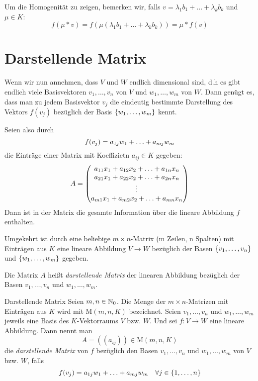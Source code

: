 Um die Homogenität zu zeigen, bemerken wir, falls $v=\lambda_1b_1+\ldots+\lambda_kb_k$ und $\mu\in K$:
\begin{equation*}
  f(\mu*v)=f(\mu(\lambda_1b_1+\ldots+\lambda_kb_k))=\mu*f(v)
\end{equation*}

\section{Darstellende Matrix}
Wenn wir nun annehmen, dass $V$ und $W$ endlich dimensional sind, d.h es gibt endlich viele Basisvektoren $v_1,\ldots,v_n$ von $V$ und $w_1,\ldots,w_m$ von $W$. Dann genügt es, dass man zu jedem Basisvektor $v_j$ die eindeutig bestimmte Darstellung des Vektors $f(v_j)$ bezüglich der Basis $\left\{ w_1,\ldots,w_m \right\}$ kennt.

Seien also durch
\begin{equation*}
  f(v_j) = a_{1j}w_1+\ldots+a_{mj}w_m
\end{equation*}
die Einträge einer Matrix mit Koeffizietn $a_{ij} \in K$ gegeben:
\begin{equation*}
  A=\matrix{
  \ma{11}x_1+\ma{12}x_2+\ldots+\ma{1n}x_n\\
  \ma{21}x_1+\ma{22}x_2+\ldots+\ma{2n}x_n\\
  \vdots\\
  \ma{m1}x_1+\ma{m2}x_2+\ldots+\ma{mn}x_n\\
  }
\end{equation*}
Dann ist in der Matrix die gesamte Information über die lineare Abbildung $f$ enthalten.

Umgekehrt ist durch eine beliebige $m\times n$-Matrix (m Zeilen, n Spalten) mit Einträgen aus $K$ eine lineare Abbildung $V\rightarrow W$ bezüglich der Basen $\left\{ v_1,\ldots,v_n \right\}$ und $\left\{ w_1,\ldots,w_m \right\}$ gegeben.

Die Matrix $A$ heißt \emph{darstellende Matrix} der linearen Abbildung bezüglich der Basen $v_1,\ldots,v_n$ und $w_1,\ldots,w_m$.

\begin{definition}{Darstellende Matrix}
	Seien $m,n\in\mathbb{N}_0$. Die Menge der $m\times n$-Matrizen mit Einträgen aus $K$ wird mit $\mathrm{M}(m,n,K)$ bezeichnet. Seien $v_1,\ldots,v_n$ und $w_1,\ldots,w_m$ jeweils eine Basis des $K$-Vektorraums $V$ bzw. $W$. Und sei $f:V\rightarrow W$ eine lineare Abbildung. Dann nennt man
	\begin{equation*}
	  A=((a_{ij}))\in \mathrm{M}(m,n,K)
	\end{equation*}
	die \emph{darstellende Matrix} von $f$ bezüglich den Basen $v_1,\ldots,v_n$ und $w_1,\ldots,w_m$ von $V$ bzw. $W$, falls
	\begin{equation*}
	  f(v_j) = a_{1j}w_1+\ldots+a_{mj}w_m \quad\forall j\in\left\{ 1,\ldots,n \right\}
	\end{equation*}
\end{definition}

